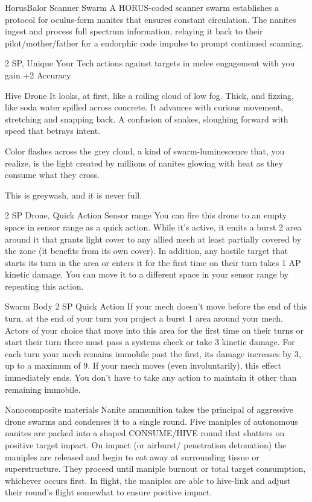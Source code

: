 \begin{mech}{Horus}{Balor}
Scanner Swarm
A HORUS-coded scanner swarm establishes a protocol for oculus-form nanites that ensures constant circulation. The nanites ingest and process full spectrum information, relaying it back to their pilot/mother/father for a endorphic code impulse to prompt continued scanning. 

2 SP, Unique
Your Tech actions against targets in melee engagement with you gain +2 Accuracy

Hive Drone
It looks, at first, like a roiling cloud of low fog. Thick, and fizzing, like soda water spilled across concrete. It advances with curious movement, stretching and snapping back. A confusion of snakes, sloughing forward with speed that betrays intent.

Color flashes across the grey cloud, a kind of swarm-luminescence that, you realize, is the light created by millions of nanites glowing with heat as they consume what they cross. 

This is greywash, and it is never full.  

2 SP
Drone, Quick Action
Sensor range
You can fire this drone to an empty space in sensor range as a quick action. While it’s active, it emits a burst 2 area around it that grants light cover to any allied mech at least partially covered by the zone (it benefits from its own cover). In addition, any hostile target that starts its turn in the area or enters it for the first time on their turn takes 1 AP kinetic damage. You can move it to a different space in your sensor range by repeating this action.

Swarm Body
2 SP
Quick Action
If your mech doesn’t move before the end of this turn, at the end of your turn you project a burst 1 area around your mech. Actors of your choice that move into this area for the first time on their turns or start their turn there must pass a systems check or take 3 kinetic damage. For each turn your mech remains immobile past the first, its damage increases by 3, up to a maximum of 9. If your mech moves (even involuntarily), this effect immediately ends. You don’t have to take any action to maintain it other than remaining immobile.

Nanocomposite materials
Nanite ammunition takes the principal of aggressive drone swarms and condenses it to a single round. Five maniples of autonomous nanites are packed into a shaped CONSUME/HIVE round that shatters on positive target impact. On impact (or airburst/ penetration detonation) the maniples are released and begin to eat away at surrounding tissue or superstructure. They proceed until maniple burnout or total target consumption, whichever occurs first. In flight, the maniples are able to hive-link and adjust their round’s flight somewhat to ensure positive impact.  


\end{mech}
